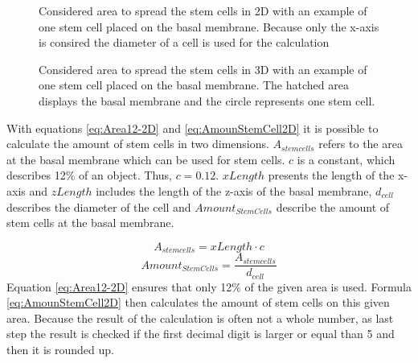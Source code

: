 \begin{figure}[ht]
\begin{center}
\caption[Considered area to spread the stem cells in two dimensions]{Considered area to spread the stem cells in 2D with an example of one stem cell placed on the basal membrane. Because only the x-axis is consired the diameter of a cell is used for the calculation}
\label{tikz:AreaIn2D}
\end{center}
\end{figure}


\begin{figure}[ht]
\begin{center}
\caption[Considered area to spread the stem cells in three dimensions]{Considered area to spread the stem cells in 3D with an example of one stem cell placed on the basal membrane. The hatched area displays the basal membrane and the circle represents one stem cell.}
\label{tikz:AreaIn3D}
\end{center}
\end{figure}


With equations \ref{eq:Area12-2D} and \ref{eq:AmounStemCell2D} it is possible to calculate the amount of stem cells in two dimensions. $A_{stem cells}$ refers to the area at the basal membrane which can be used for stem cells. $c$ is a constant, which describes 12\% of an object. Thus, $c=0.12$. $xLength$ presents the length of the x-axis and $zLength$ includes the length of the z-axis of the basal membrane, $d_{cell}$ describes the diameter of the cell and $Amount_{StemCells}$ describe the amount of stem cells at the basal membrane.

\begin{equation}\label{eq:Area12-2D}
A_{stem cells} = xLength \cdot c
\end{equation}
\begin{equation}\label{eq:AmounStemCell2D}
Amount_{StemCells} = \dfrac{A_{stem cells}}{d_{cell}} 
\end{equation}
Equation \ref{eq:Area12-2D} ensures that only 12\% of the given area is used. Formula \ref{eq:AmounStemCell2D} then calculates the amount of stem cells on this given area. Because the result of the calculation is often not a whole number, as last step the result is checked if the first decimal digit is larger or equal than 5 and then it is rounded up.

